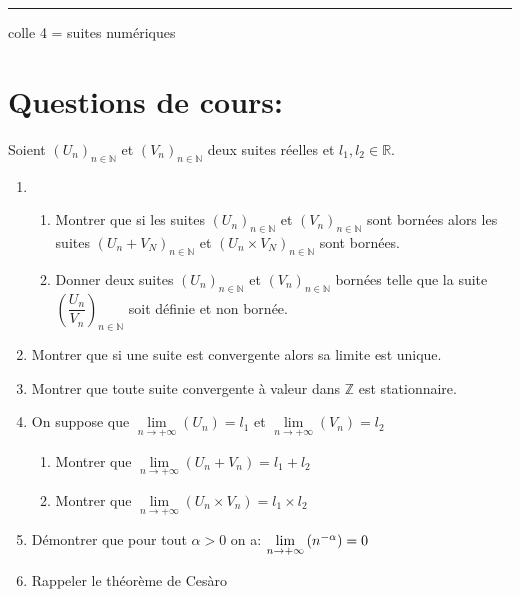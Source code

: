 \documentclass[10pt,a4paper]{article}
\newcommand{\R}{\mathbb{R}}
\newcommand{\Z}{\mathbb{Z}}
\newcommand{\N}{\mathbb{N}}
\theoremstyle{definition}
\theoremstyle{definition}
\begin{document}
	
	\rule[0.5ex]{\textwidth}{0.1mm}	
	
	\begin{center}
		\Large \sc colle 4 = suites numériques
	\end{center}
	
\section*{Questions de cours:}
\noindent Soient $(U_n)_{n\in\N}$ et $(V_n)_{n\in\N}$ deux suites réelles et $l_1,l_2 \in \R$. 
\begin{enumerate} %
\item  \begin{enumerate}
\item Montrer que si les suites $(U_n)_{n\in\N}$ et $(V_n)_{n\in\N}$ sont bornées alors les suites $(U_n+ V_N)_{n\in\N}$ et $(U_n \times V_N)_{n\in\N}$ sont bornées.
\item Donner deux suites $(U_n)_{n\in\N}$ et $(V_n)_{n\in\N}$ bornées telle que la suite $\left(\dfrac{U_n}{V_n}\right)_{n\in\N}$ soit définie et non bornée. 
\end{enumerate}
\item Montrer que si une suite est convergente alors sa limite est unique. 
\item Montrer que toute suite convergente à valeur dans $\Z$ est stationnaire.
\item On suppose que $\lim\limits_{n\rightarrow+\infty}(U_n) = l_1$ et $\lim\limits_{n\rightarrow+\infty}(V_n) = l_2$
\begin{enumerate}
\item Montrer que $\lim\limits_{n\rightarrow+\infty}(U_n + V_n) = l_1 + l_2$
\item Montrer que $\lim\limits_{n\rightarrow+\infty}(U_n \times V_n) = l_1 \times l_2$
\end{enumerate}
\item Démontrer que pour tout $\alpha>0$ on a: $\lim\limits_{\small n\rightarrow+\infty}\left(n^{-\alpha}\right) = 0$
\item Rappeler le théorème de Cesàro  
\end{enumerate}
\end{document}
